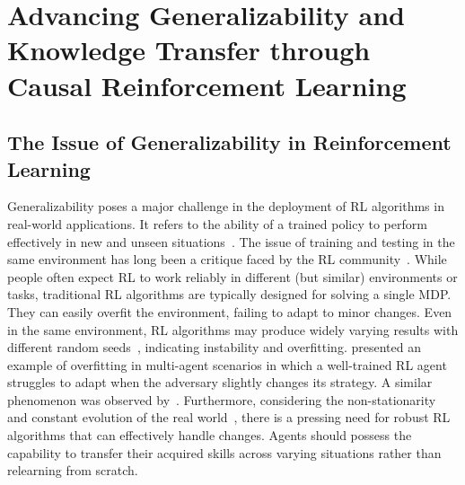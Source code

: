 \documentclass[10pt]{article} %
\theoremstyle{definition}
\begin{document}
%
%
\section{Advancing Generalizability and Knowledge Transfer through Causal Reinforcement Learning}
\label{sec:3generalizability}

\subsection{The Issue of Generalizability in Reinforcement Learning}

Generalizability poses a major challenge in the deployment of RL algorithms in real-world applications. It refers to the ability of a trained policy to perform effectively in new and unseen situations~\citep{kirkSurveyGeneralisationDeep2022}. The issue of training and testing in the same environment has long been a critique faced by the RL community~\citep{irpanDeepReinforcementLearning2018}.
While people often expect RL to work reliably in different (but similar) environments or tasks, traditional RL algorithms are typically designed for solving a single MDP. They can easily overfit the environment, failing to adapt to minor changes. Even in the same environment, RL algorithms may produce widely varying results with different random seeds~\citep{zhangDissectionOverfittingGeneralization2018, zhangStudyOverfittingDeep2018}, indicating instability and overfitting. 
\citet{lanctotUnifiedGameTheoreticApproach2017} presented an example of overfitting in multi-agent scenarios in which a well-trained RL agent struggles to adapt when the adversary slightly changes its strategy. A similar phenomenon was observed by~\citet{raghuCanDeepReinforcement2018}.
Furthermore, considering the non-stationarity and constant evolution of the real world~\citep{hamadanianHowReinforcementLearning2022}, there is a pressing need for robust RL algorithms that can effectively handle changes. Agents should possess the capability to transfer their acquired skills across varying situations rather than relearning from scratch.
\end{document}
